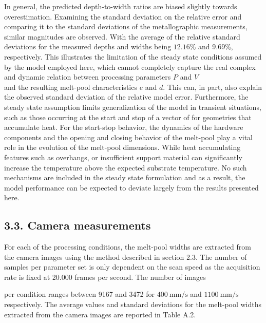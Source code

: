 \documentclass[10pt]{article}
\begin{document}
In general, the predicted depth-to-width ratios are biased slightly towards overestimation. Examining the standard deviation on the relative error and comparing it to the standard deviations of the metallographic measurements, similar magnitudes are observed. With the average of the relative standard deviations for the measured depths and widths being $12.16 \%$ and $9.69 \%$, respectively. This illustrates the limitation of the steady state conditions assumed by the model employed here, which cannot completely capture the real complex and dynamic relation between processing parameters $P$ and $V$\\
and the resulting melt-pool characteristics $e$ and $d$. This can, in part, also explain the observed standard deviation of the relative model error. Furthermore, the steady state assumption limits generalization of the model in transient situations, such as those occurring at the start and stop of a vector of for geometries that accumulate heat. For the start-stop behavior, the dynamics of the hardware components and the opening and closing behavior of the melt-pool play a vital role in the evolution of the melt-pool dimensions. While heat accumulating features such as overhangs, or insufficient support material can significantly increase the temperature above the expected substrate temperature. No such mechanisms are included in the steady state formulation and as a result, the model performance can be expected to deviate largely from the results presented here.

\subsection*{3.3. Camera measurements}
For each of the processing conditions, the melt-pool widths are extracted from the camera images using the method described in section 2.3. The number of samples per parameter set is only dependent on the scan speed as the acquisition rate is fixed at 20.000 frames per second. The number of images

per condition ranges between 9167 and 3472 for $400 \mathrm{~mm} / \mathrm{s}$ and $1100 \mathrm{~mm} / \mathrm{s}$ respectively. The average values and standard deviations for the melt-pool widths extracted from the camera images are reported in Table A.2.
\end{document}
